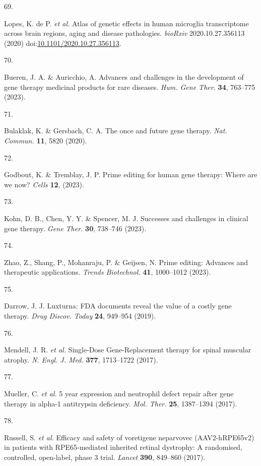 \documentclass[
]{article}
\newlength{\cslhangindent}
\newlength{\csllabelwidth}
\newenvironment{CSLReferences}[2] %
 {\begin{list}{}{%
  \setlength{\itemindent}{0pt}
  \setlength{\leftmargin}{0pt}
  \setlength{\parsep}{0pt}
  \ifodd #1
   \setlength{\leftmargin}{\cslhangindent}
   \setlength{\itemindent}{-1\cslhangindent}
  \fi
  \setlength{\itemsep}{#2\baselineskip}}}
 {\end{list}}
\newcommand{\CSLLeftMargin}[1]{\parbox[t]{\csllabelwidth}{\strut#1\strut}}
\newcommand{\CSLRightInline}[1]{\parbox[t]{\linewidth - \csllabelwidth}{\strut#1\strut}}
\begin{document}
\begin{CSLReferences}{0}{0}
\CSLLeftMargin{69. }%
\CSLRightInline{Lopes, K. de P. \emph{et al.} Atlas of genetic effects
in human microglia transcriptome across brain regions, aging and disease
pathologies. \emph{bioRxiv} 2020.10.27.356113 (2020)
doi:\href{https://doi.org/10.1101/2020.10.27.356113}{10.1101/2020.10.27.356113}.}

\CSLLeftMargin{70. }%
\CSLRightInline{Bueren, J. A. \& Auricchio, A. Advances and challenges
in the development of gene therapy medicinal products for rare diseases.
\emph{Hum. Gene Ther.} \textbf{34}, 763--775 (2023).}

\CSLLeftMargin{71. }%
\CSLRightInline{Bulaklak, K. \& Gersbach, C. A. The once and future gene
therapy. \emph{Nat. Commun.} \textbf{11}, 5820 (2020).}

\CSLLeftMargin{72. }%
\CSLRightInline{Godbout, K. \& Tremblay, J. P. Prime editing for human
gene therapy: Where are we now? \emph{Cells} \textbf{12}, (2023).}

\CSLLeftMargin{73. }%
\CSLRightInline{Kohn, D. B., Chen, Y. Y. \& Spencer, M. J. Successes and
challenges in clinical gene therapy. \emph{Gene Ther.} \textbf{30},
738--746 (2023).}

\CSLLeftMargin{74. }%
\CSLRightInline{Zhao, Z., Shang, P., Mohanraju, P. \& Geijsen, N. Prime
editing: Advances and therapeutic applications. \emph{Trends
Biotechnol.} \textbf{41}, 1000--1012 (2023).}

\CSLLeftMargin{75. }%
\CSLRightInline{Darrow, J. J. Luxturna: {FDA} documents reveal the value
of a costly gene therapy. \emph{Drug Discov. Today} \textbf{24},
949--954 (2019).}

\CSLLeftMargin{76. }%
\CSLRightInline{Mendell, J. R. \emph{et al.} {Single-Dose}
{Gene-Replacement} therapy for spinal muscular atrophy. \emph{N. Engl.
J. Med.} \textbf{377}, 1713--1722 (2017).}

\CSLLeftMargin{77. }%
\CSLRightInline{Mueller, C. \emph{et al.} 5 year expression and
neutrophil defect repair after gene therapy in alpha-1 antitrypsin
deficiency. \emph{Mol. Ther.} \textbf{25}, 1387--1394 (2017).}

\CSLLeftMargin{78. }%
\CSLRightInline{Russell, S. \emph{et al.} Efficacy and safety of
voretigene neparvovec ({AAV2-hRPE65v2}) in patients with
{RPE65-mediated} inherited retinal dystrophy: A randomised, controlled,
open-label, phase 3 trial. \emph{Lancet} \textbf{390}, 849--860 (2017).}


\end{CSLReferences}
\end{document}

